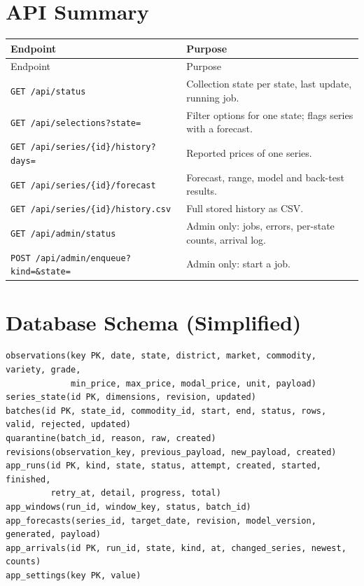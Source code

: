 \documentclass[12pt,a4paper,oneside]{report}
\numberwithin{equation}{chapter}
\numberwithin{figure}{chapter}
\numberwithin{table}{chapter}
\theoremstyle{definition}
\begin{document}
\chapter{API Summary}
\begin{longtable}{@{}p{}p{}@{}}
\toprule
Endpoint & Purpose \\
\midrule
\endfirsthead
\toprule
Endpoint & Purpose \\
\midrule
\endhead
\texttt{GET /api/status} & Collection state per state, last update, running job. \\
\texttt{GET /api/selections?state=} & Filter options for one state; flags series with a forecast. \\
\texttt{GET /api/series/\{id\}/history?days=} & Reported prices of one series. \\
\texttt{GET /api/series/\{id\}/forecast} & Forecast, range, model and back-test results. \\
\texttt{GET /api/series/\{id\}/history.csv} & Full stored history as CSV. \\
\texttt{GET /api/admin/status} & Admin only: jobs, errors, per-state counts, arrival log. \\
\texttt{POST /api/admin/enqueue?kind=\&state=} & Admin only: start a job. \\
\bottomrule
\end{longtable}

\chapter{Database Schema (Simplified)}
\begin{lstlisting}[caption={Main tables}]
observations(key PK, date, state, district, market, commodity, variety, grade,
             min_price, max_price, modal_price, unit, payload)
series_state(id PK, dimensions, revision, updated)
batches(id PK, state_id, commodity_id, start, end, status, rows, valid, rejected, updated)
quarantine(batch_id, reason, raw, created)
revisions(observation_key, previous_payload, new_payload, created)
app_runs(id PK, kind, state, status, attempt, created, started, finished,
         retry_at, detail, progress, total)
app_windows(run_id, window_key, status, batch_id)
app_forecasts(series_id, target_date, revision, model_version, generated, payload)
app_arrivals(id PK, run_id, state, kind, at, changed_series, newest, counts)
app_settings(key PK, value)
\end{lstlisting}
\end{document}
